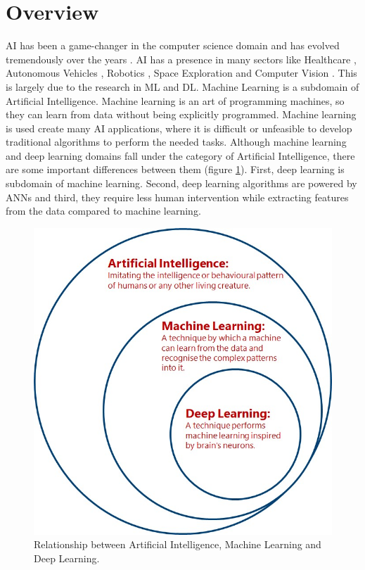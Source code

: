 \justifying
\setlength{\parskip}{1em}


\section{Overview}

\ac{AI} has been a game-changer in the computer science domain and has evolved tremendously over the years \cite{goodfellow2017deep}. \ac{AI} has a presence in many sectors like Healthcare \cite{Yu.2018}, Autonomous Vehicles \cite{Yurtsever_2020}, Robotics \cite{10.1007/978-3-642-82153-0_2}, Space Exploration \cite{Girimonte2007} and Computer Vision \cite{2020}. This is largely due to the research in \ac{ML} and \ac{DL}. Machine Learning is a subdomain of Artificial Intelligence. Machine learning is an art of programming machines, so they can learn from data without being explicitly programmed. Machine learning is used create many \ac{AI} applications, where it is difficult or unfeasible to develop traditional algorithms to perform the needed tasks. Although machine learning and deep learning domains fall under the category of Artificial Intelligence, there are some important differences between them (figure \ref{fig:deepLearningSubset}). First, deep learning is subdomain of machine learning. Second, deep learning algorithms are powered by \acp{ANN} and third, they require less human intervention while extracting features from the data compared to machine learning.


\begin{figure}[H]
        \begin{center}
 	    \includegraphics[scale=0.48]{images/Introduction/deeplearningsubset.jpg}
	    \caption[Relationship between Artificial Intelligence, Machine Learning and Deep Learning.]{Relationship between Artificial Intelligence, Machine Learning and Deep Learning.}
	    \label{fig:deepLearningSubset}
	    \end{center}
\end{figure}


